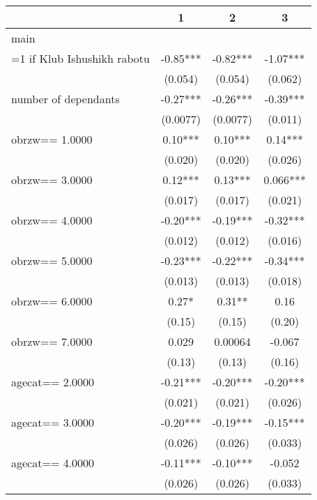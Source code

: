 {
\def\sym#1{\ifmmode^{#1}\else\(^{#1}\)\fi}
\begin{tabular}{l*{3}{c}}
\toprule
                &\multicolumn{1}{c}{1}&\multicolumn{1}{c}{2}&\multicolumn{1}{c}{3}\\
\midrule
main            &            &            &            \\
=1 if Klub Ishushikh rabotu&    -0.85***&    -0.82***&    -1.07***\\
                &  (0.054)   &  (0.054)   &  (0.062)   \\
\addlinespace
number of dependants&    -0.27***&    -0.26***&    -0.39***\\
                & (0.0077)   & (0.0077)   &  (0.011)   \\
\addlinespace
obrzw==     1.0000&     0.10***&     0.10***&     0.14***\\
                &  (0.020)   &  (0.020)   &  (0.026)   \\
\addlinespace
obrzw==     3.0000&     0.12***&     0.13***&    0.066***\\
                &  (0.017)   &  (0.017)   &  (0.021)   \\
\addlinespace
obrzw==     4.0000&    -0.20***&    -0.19***&    -0.32***\\
                &  (0.012)   &  (0.012)   &  (0.016)   \\
\addlinespace
obrzw==     5.0000&    -0.23***&    -0.22***&    -0.34***\\
                &  (0.013)   &  (0.013)   &  (0.018)   \\
\addlinespace
obrzw==     6.0000&     0.27*  &     0.31** &     0.16   \\
                &   (0.15)   &   (0.15)   &   (0.20)   \\
\addlinespace
obrzw==     7.0000&    0.029   &  0.00064   &   -0.067   \\
                &   (0.13)   &   (0.13)   &   (0.16)   \\
\addlinespace
agecat==     2.0000&    -0.21***&    -0.20***&    -0.20***\\
                &  (0.021)   &  (0.021)   &  (0.026)   \\
\addlinespace
agecat==     3.0000&    -0.20***&    -0.19***&    -0.15***\\
                &  (0.026)   &  (0.026)   &  (0.033)   \\
\addlinespace
agecat==     4.0000&    -0.11***&    -0.10***&   -0.052   \\
                &  (0.026)   &  (0.026)   &  (0.033)   \\

\end{tabular}}
